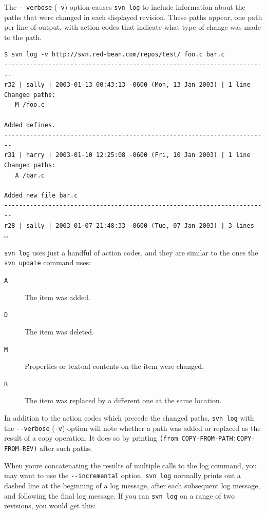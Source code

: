 The \texttt{-\/-verbose} (\texttt{-v}) option causes \texttt{svn\ log}
to include information about the paths that were changed in each
displayed revision. These paths appear, one path per line of output,
with action codes that indicate what type of change was made to the
path.

\begin{verbatim}
$ svn log -v http://svn.red-bean.com/repos/test/ foo.c bar.c
------------------------------------------------------------------------
r32 | sally | 2003-01-13 00:43:13 -0600 (Mon, 13 Jan 2003) | 1 line
Changed paths:
   M /foo.c

Added defines.
------------------------------------------------------------------------
r31 | harry | 2003-01-10 12:25:08 -0600 (Fri, 10 Jan 2003) | 1 line
Changed paths:
   A /bar.c

Added new file bar.c
------------------------------------------------------------------------
r28 | sally | 2003-01-07 21:48:33 -0600 (Tue, 07 Jan 2003) | 3 lines
…
\end{verbatim}

\texttt{svn\ log} uses just a handful of action codes, and they are
similar to the ones the \texttt{svn\ update} command uses:

\begin{description}
\item[\texttt{A}]
The item was added.
\item[\texttt{D}]
The item was deleted.
\item[\texttt{M}]
Properties or textual contents on the item were changed.
\item[\texttt{R}]
The item was replaced by a different one at the same location.
\end{description}

In addition to the action codes which precede the changed paths,
\texttt{svn\ log} with the \texttt{-\/-verbose} (\texttt{-v}) option
will note whether a path was added or replaced as the result of a copy
operation. It does so by printing
\texttt{(from\ COPY-FROM-PATH:COPY-FROM-REV)} after such paths.

When you\textquotesingle re concatenating the results of multiple calls
to the log command, you may want to use the \texttt{-\/-incremental}
option. \texttt{svn\ log} normally prints out a dashed line at the
beginning of a log message, after each subsequent log message, and
following the final log message. If you ran \texttt{svn\ log} on a range
of two revisions, you would get this:

